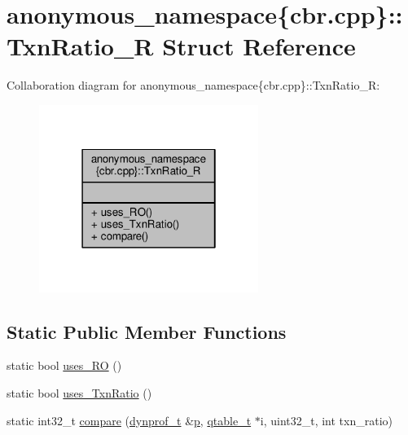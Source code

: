 \hypertarget{structanonymous__namespace_02cbr_8cpp_03_1_1TxnRatio__R}{\section{anonymous\-\_\-namespace\{cbr.\-cpp\}\-:\-:Txn\-Ratio\-\_\-\-R Struct Reference}
\label{structanonymous__namespace_02cbr_8cpp_03_1_1TxnRatio__R}
}


Collaboration diagram for anonymous\-\_\-namespace\{cbr.\-cpp\}\-:\-:Txn\-Ratio\-\_\-\-R\-:
\nopagebreak
\begin{figure}[H]
\begin{center}
\leavevmode
\includegraphics[width=202pt]{structanonymous__namespace_02cbr_8cpp_03_1_1TxnRatio__R__coll__graph}
\end{center}
\end{figure}
\subsection*{Static Public Member Functions}
\begin{DoxyCompactItemize}
\item 
static bool \hyperlink{structanonymous__namespace_02cbr_8cpp_03_1_1TxnRatio__R_aeb0fcb3092d8daad761ebca1c2624de7}{uses\-\_\-\-R\-O} ()
\item 
static bool \hyperlink{structanonymous__namespace_02cbr_8cpp_03_1_1TxnRatio__R_ae8ad99fe71cd5c686c4b7e4cf55fd38c}{uses\-\_\-\-Txn\-Ratio} ()
\item 
static int32\-\_\-t \hyperlink{structanonymous__namespace_02cbr_8cpp_03_1_1TxnRatio__R_a62da65523daf74f273c21943a5939180}{compare} (\hyperlink{structstm_1_1dynprof__t}{dynprof\-\_\-t} \&\hyperlink{counted__ptr_8hpp_a5c9f59d7c24e3fd6ceae319a968fc3e0}{p}, \hyperlink{structstm_1_1qtable__t}{qtable\-\_\-t} $\ast$i, uint32\-\_\-t, int txn\-\_\-ratio)
\end{DoxyCompactItemize}


